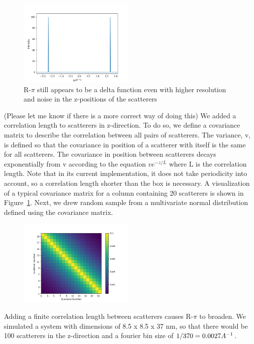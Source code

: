 \documentclass{article}
\begin{document}
  \begin{figure}
  \centering
  \includegraphics[width=0.5\textwidth]{tall_rpi.png}
  \caption{R-$\pi$ still appears to be a delta function even with higher resolution and
  noise in the z-positions of the scatterers}
  \end{figure}

  (Please let me know if there is a more correct way of doing this)
  We added a correlation length to scatterers in z-direction. To do so, we
  define a covariance matrix to describe the correlation between all pairs of
  scatterers.  The variance, v, is defined so that the covariance in position of
  a scatterer with itself is the same for all scatterers. The covariance in
  position between scatterers decays exponentially from v according to the
  equation $ve^{-z/L}$ where L is the correlation length. Note that in its
  current implementation, it does not take periodicity into account, so a
  correlation length shorter than the box is necessary. A visualization of a
  typical covariance matrix for a column containing 20 scatterers is shown in
  Figure~\ref{fig:covariance}. Next, we drew random sample from a multivariate
  normal distribution defined using the covariance matrix.

  \begin{figure}
  \centering
  \includegraphics[width=0.5\textwidth]{covariance.png}
  \caption{}\label{fig:covariance}
  \end{figure}

  Adding a finite correlation length between scatterers causes R-$\pi$ to
  broaden. We simulated a system with dimensions of 8.5 x 8.5 x 37 nm, so that
  there would be 100 scatterers in the z-direction and a fourier bin size of
  $1/370=0.0027 \\A^{-1}$.
\end{document}
